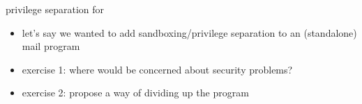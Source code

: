 \begin{frame}{privilege separation for}
    \begin{itemize}
    \item let's say we wanted to add sandboxing/privilege separation to an (standalone) mail program
    \vspace{.5cm}
    \item exercise 1: where would be concerned about security problems?
    \item exercise 2: propose a way of dividing up the program
    \end{itemize}
\end{frame}
